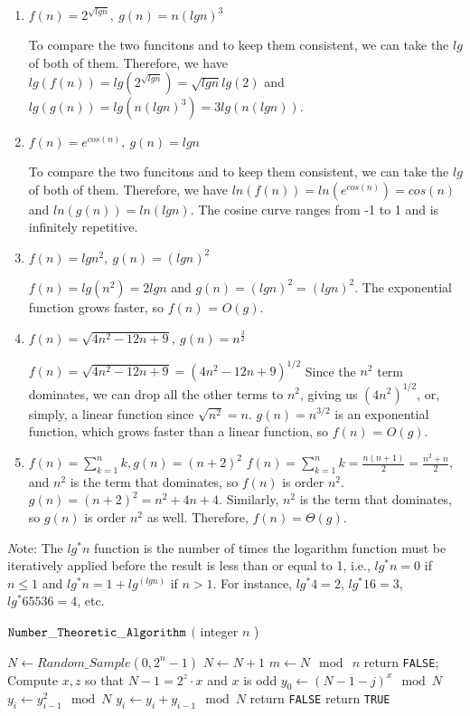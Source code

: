 \documentclass{article}
\begin{document}
\begin{enumerate}
\item $f(n) = 2^{\sqrt{lgn}},\ g(n) = n(lgn)^3$

To compare the two funcitons and to keep them consistent, we can take the $lg$ of both of them. Therefore, we have $lg(f(n))=lg(2^{\sqrt{lgn}})=\sqrt{lgn}lg(2)$ and $lg(g(n))=lg(n(lgn)^3)=3lg(n(lgn))$. 

\item $f(n) = e^{cos(n)},\ g(n) = lgn$

To compare the two funcitons and to keep them consistent, we can take the $lg$ of both of them. Therefore, we have $ln(f(n)) = ln(e^{cos(n)}) = cos(n)$ and $ln(g(n)) = ln(lgn)$. The cosine curve ranges from -1 to 1 and is infinitely repetitive. 

\item $f(n) = lgn^2,\ g(n) = (lgn)^2$

$f(n)=lg(n^2)=2lgn$ and $g(n)=(lgn)^2=(lgn)^2$. The exponential function grows faster, so $f(n)$ = $O(g)$.

\item $f(n) = \sqrt{4n^2 - 12n + 9},\ g(n) = n^{\frac{3}{2}}$

$f(n)=\sqrt{4n^2 - 12n + 9}=(4n^2-12n+9)^{1/2}$ Since the $n^2$ term dominates, we can drop all the other terms to $n^2$, giving us $(4n^2)^{1/2}$, or, simply, a linear function since $\sqrt{n^2}=n$. $g(n)=n^{3/2}$ is an exponential function, which grows faster than a linear function, so $f(n)$ = $O(g)$.

\item $f(n) = \sum_{k=1}^{n} k, g(n) = (n+2)^2$
$f(n) = \sum_{k=1}^{n} k=\frac{n(n+1)}{2}=\frac{n^2+n}{2}$, and $n^2$ is the term that dominates, so $f(n)$ is order $n^2$. $g(n)=(n+2)^2=n^2+4n+4$. Similarly, $n^2$ is the term that dominates, so $g(n)$ is order $n^2$ as well. Therefore, $f(n)=\Theta(g)$.

\end{enumerate}

{\emph Note:} The $lg^*n$ function is the number of times the
logarithm function must be iteratively applied before the result is
less than or equal to 1, i.e., $lg^*n = 0$ if $n \leq 1$ and $lg^*n =
1 + lg^(lgn)$ if $n > 1$. For instance, $lg^*4=2$, $lg^*16=3$,
$lg^*65536=4$, etc.


\begin{algorithm}[h]
\caption{${\tt Number\_Theoretic\_Algorithm}$ $($ integer $n$ ) }
\label{algo}
$N \leftarrow Random\_Sample( 0, 2^n-1)$\;
{
  $N \leftarrow N + 1$\;
}
$m \leftarrow N \mod\ n$\;
{
  {
    return {\tt FALSE};
  }
  Compute $x,z$ so that $N - 1 = 2^z \cdot x$ and $x$ is odd\;
  $y_0 \leftarrow (N-1-j)^x \mod N$\;
  {
    $y_i \leftarrow y_{i-1}^2 \mod N$\;
    $y_i \leftarrow y_i + y_{i-1} \mod N$\;
  }
  {
    return {\tt FALSE}\;
  }
}
return {\tt TRUE}\;
\end{algorithm}
\end{document}
